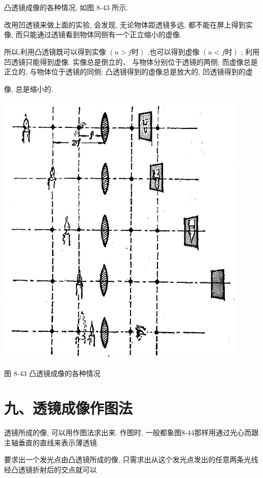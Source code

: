 \documentclass[10pt]{article}
\begin{document}
凸透镜成像的各种情况, 如图 8-43 所示.

改用凹透镜来做上面的实验, 会发现, 无论物体距透镜多远, 都不能在屏上得到实像, 而只能通过透镜看到物体同侧有一个正立缩小的虚像.

所以,利用凸透镜既可以得到实像 \(\left( {u > f\text{时}}\right)\) ,也可以得到虚像 \(\left( {u < f\text{时}}\right)\) ; 利用凹透镜只能得到虚像. 实像总是倒立的、 与物体分别位于透镜的两侧; 而虚像总是正立的, 与物体位于透镜的同侧; 凸透镜得到的虚像总是放大的, 凹透镜得到的虚

像, 总是缩小的.

\begin{center}
\includegraphics[max width=0.9\textwidth]{images/01913056-1f15-74d8-9184-9aab52c9d66b_277_619390.jpg}
\end{center}

图 8-43 凸透镜成像的各种情况

\section*{九、透镜成像作图法}

透镜所成的像, 可以用作图法求出来. 作图时, 一般都象图8-44那样用通过光心而跟主轴垂直的直线来表示薄透镜.

要求出一个发光点由凸透镜所成的像, 只需求出从这个发光点发出的任意两条光线经凸透镜折射后的交点就可以
\end{document}
